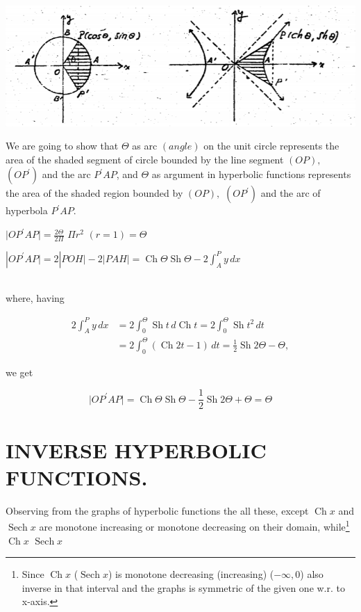 \documentclass[11pt]{amsbook}
\begin{document}

    \begin{center}
        \includegraphics{images/hw1.png}
    \end{center}
    
    We are going to show that $\Theta$ as arc $(angle)$ on the unit
    circle represents the area of the shaded segment of circle bounded by the line segment $(OP),$ $(OP^\prime)$ and the arc $P^\prime AP$, and $\Theta$ as argument in hyperbolic functions represents the area of the shaded region bounded by $(OP),$ $(OP^\prime)$ and the arc of hyperbola $P^\prime AP$.
    
    \begin{hEnumerateAlpha}
        \item $|OP^\prime AP \vert = \frac{2\Theta}{2\Pi} $ $ \Pi r^2 $ $(r = 1) = \Theta$
        \item $|OP^\prime AP \vert = 2 |POH \vert -2|PAH \vert = \operatorname{Ch}\Theta \operatorname{Sh}\Theta - 2 \int_A^P y \,dx$
    \end{hEnumerateAlpha}
    
    $ $\\
    \noindent
    where, having 
    
    \begin{align*}
        2 \int_A^P y \,dx &= 2 \int_0^\Theta \operatorname{Sh}t \,d\operatorname{Ch}t = 2 \int_0^\Theta \operatorname{Sh}t^2 \,dt
        \\
        &= 2 \int_0^\Theta (\operatorname{Ch}2t - 1) \,dt = \frac{1}{2} \operatorname{Sh}2\Theta - \Theta ,
    \end{align*}
    
    \noindent
    we get 
    
    \[
        |OP^\prime AP \vert = \operatorname{Ch}\Theta \operatorname{Sh}\Theta - \frac{1}{2} \operatorname{Sh}2\Theta + \Theta = \Theta
    \]
    
    \section{INVERSE HYPERBOLIC FUNCTIONS.}
    
    Observing from the graphs of hyperbolic functions the all these, except $\operatorname{Ch}x$ and $\operatorname{Sech} x$ are monotone increasing or monotone decreasing on their domain, while\footnote{Since $\operatorname{Ch} x$ ($\operatorname{Sech} x$) is monotone decreasing (increasing) ($-\infty , 0$) also inverse in that interval and the graphs is symmetric of the given one w.r. to x-axis.} $\operatorname{Ch}x$ $\operatorname{Sech} x$
\end{document}
